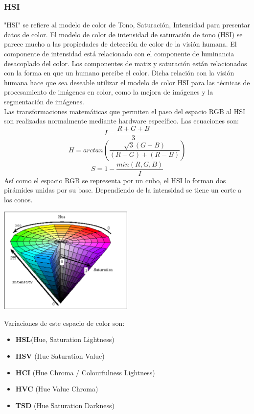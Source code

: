 \subsubsection{HSI}
"HSI" se refiere al modelo de color de Tono, Saturación, Intensidad para presentar datos
de color. El modelo de color de intensidad de saturación de tono (HSI) se parece mucho
a las propiedades de detección de color de la visión humana. El componente de intensidad
está relacionado con el componente de luminancia desacoplado del color. Los componentes
de matiz y saturación están relacionados con la forma en que un humano percibe el color.
Dicha relación con la visión humana hace que sea deseable utilizar el modelo de color
HSI para las técnicas de procesamiento de imágenes en color, como la mejora de imágenes
y la segmentación de imágenes.\cite{Article:taiy2000}\\
Las transformaciones matemáticas que permiten el paso del espacio RGB al HSI
son realizadas normalmente mediante hardware específico. Las ecuaciones son:
\begin{equation}
	I=\frac{R+G+B}{3}
\end{equation}
\begin{equation}
	H = arctan \left( \frac{\sqrt{3}(G-B)}{(R-G)+(R-B)} \right)
\end{equation}
\begin{equation}
	S = 1 - \frac{min(R,G,B)}{I}
\end{equation}
Así como el espacio RGB se representa por un cubo, el HSI lo forman dos
pirámides unidas por su base. Dependiendo de la intensidad se tiene un corte a los
conos.
\begin{center}
	\includegraphics[width=0.5\textwidth]{Contenido/Cuerpo/Capitulo2/Fig11.eps}
	\label{fig:MarcoTeorico:Fig21}
\end{center}
Variaciones de este espacio de color son:
\begin{itemize}
	\item \textbf{HSL}(Hue, Saturation Lightness)
	\item \textbf{HSV} (Hue Saturation Value)
	\item \textbf{HCI} (Hue Chroma / Colourfulness Lightness)
	\item \textbf{HVC} (Hue Value Chroma)
	\item \textbf{TSD} (Hue Saturation Darkness)
\end{itemize}

